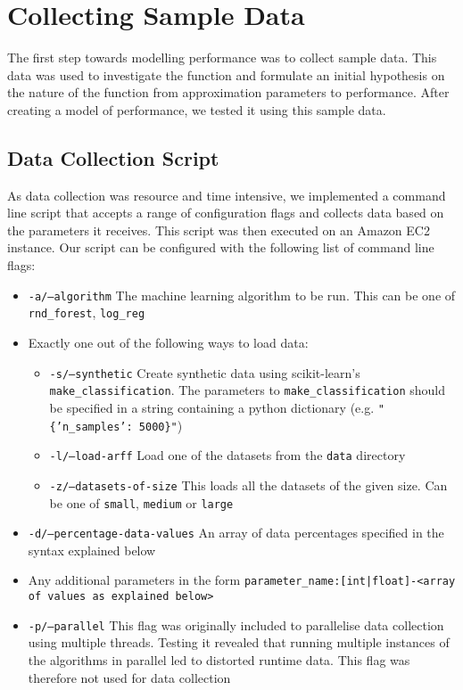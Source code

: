 \documentclass[a4paper,12pt,twoside,openright]{report}
\begin{document}
\section{Collecting Sample Data}
The first step towards modelling performance was to collect sample data. This data was used to investigate the function and formulate an initial hypothesis on the nature of the function from approximation parameters to performance. After creating a model of performance, we tested it using this sample data.

\subsection{Data Collection Script}
As data collection was resource and time intensive, we implemented a command line script that accepts a range of configuration flags and collects data based on the parameters it receives. This script was then executed on an Amazon EC2 instance. Our script can be configured with the following list of command line flags:

\begin{itemize}
\item \texttt{-a/--algorithm} The machine learning algorithm to be run. This can be one of \texttt{rnd\_forest}, \texttt{log\_reg}
\item Exactly one out of the following ways to load data:
\begin{itemize}[label=$\star$]
        \item \texttt{-s/--synthetic} Create synthetic data using scikit-learn's \texttt{make\_classification}. The parameters to \texttt{make\_classification} should be specified in a string containing a python dictionary (e.g. \texttt{"\{'n\_samples': 5000\}"})
        \item \texttt{-l/--load-arff} Load one of the datasets from the \texttt{data} directory
        \item \texttt{-z/--datasets-of-size} This loads all the datasets of the given size. Can be one of \texttt{small}, \texttt{medium} or \texttt{large}
     \end{itemize}
\item \texttt{-d/--percentage-data-values} An array of data percentages specified in the syntax explained below
\item Any additional parameters in the form \texttt{parameter\_name:[int|float]-<array of values as explained below>}
\item \texttt{-p/--parallel} This flag was originally included to parallelise data collection using multiple threads. Testing it revealed that running multiple instances of the algorithms in parallel led to distorted runtime data. This flag was therefore not used for data collection
\end{itemize}
\end{document}
